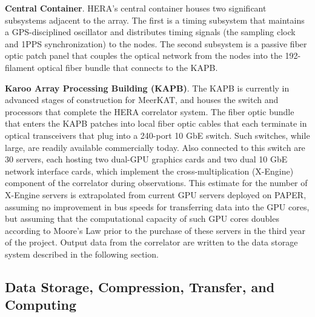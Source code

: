 \documentclass[ars]{/Users/daviddeboer1/Documents/Papers/Copernicus_LaTeX_Package_v_2_7/copernicus}
\begin{document}
{\bf Central Container}.
HERA's central container houses two significant subsystems adjacent to the array.  The first is a timing subsystem
that maintains a GPS-disciplined oscillator and distributes timing
signals (the sampling clock and 1PPS synchronization) to the nodes.  The second
subsystem is a passive fiber optic patch panel that couples
the optical network from the nodes into the 192-filament optical fiber bundle 
that connects to the KAPB. 

{\bf Karoo Array Processing Building (KAPB)}.
The KAPB is currently
in advanced stages of construction for MeerKAT, and houses the switch and processors
that 
complete the HERA correlator system.  The fiber optic bundle that enters the KAPB patches
into local fiber optic cables 
that each terminate in optical transceivers that plug into a 240-port 10 GbE switch.
Such switches, while large, are readily available commercially today.  Also connected to
this switch are 30 servers, each hosting two dual-GPU graphics cards and two dual
10 GbE network interface cards, which implement the cross-multiplication (X-Engine) component
of the correlator during observations.  This estimate for the number of X-Engine servers
is extrapolated from current GPU servers deployed on PAPER, assuming no improvement in bus
speeds for transferring data into the GPU cores, but assuming that the computational
capacity of such GPU cores doubles according to Moore's Law prior to the purchase of
these servers in the third year of the project.
Output data from the correlator are written to the data storage system described
in the following section.


\subsection{Data Storage, Compression, Transfer, and Computing}
\label{sec:data}
\end{document}
